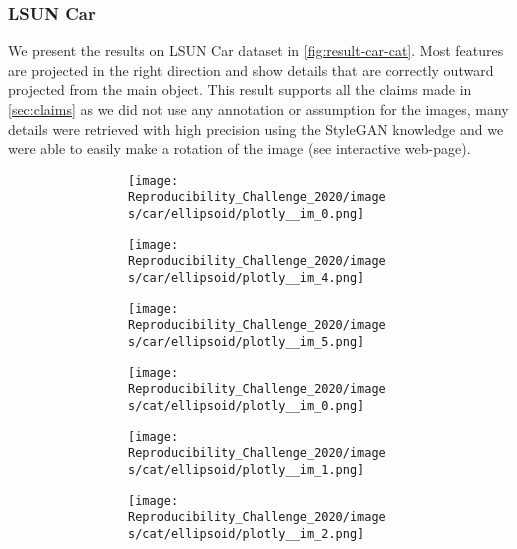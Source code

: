 \subsubsection{LSUN Car}
We present the results on LSUN Car dataset in \autoref{fig:result-car-cat}. Most features are projected in the right direction and show details that are correctly outward projected from the main object. This result supports all the claims made in \autoref{sec:claims} as we did not use any annotation or assumption for the images, many details were retrieved with high precision using the StyleGAN knowledge and we were able to easily make a rotation of the image (see interactive web-page).
\begin{figure}[h]
    \centering
    \begin{subfigure}{0.80\textwidth}
    \begin{subfigure}{0.16\textwidth}
        \centering
        \texttt{[image: Reproducibility\_Challenge\_2020/images/car/ellipsoid/plotly\_\_im\_0.png]}
    \end{subfigure}
    \begin{subfigure}{0.16\textwidth}
        \centering
        \texttt{[image: Reproducibility\_Challenge\_2020/images/car/ellipsoid/plotly\_\_im\_4.png]}
    \end{subfigure}
    \begin{subfigure}{0.16\textwidth}
        \centering
        \texttt{[image: Reproducibility\_Challenge\_2020/images/car/ellipsoid/plotly\_\_im\_5.png]}
    \end{subfigure}
    \begin{subfigure}{0.16\textwidth}
        \centering
        \texttt{[image: Reproducibility\_Challenge\_2020/images/cat/ellipsoid/plotly\_\_im\_0.png]}
    \end{subfigure}
    \begin{subfigure}{0.16\textwidth}
        \centering
        \texttt{[image: Reproducibility\_Challenge\_2020/images/cat/ellipsoid/plotly\_\_im\_1.png]}
    \end{subfigure}
    \begin{subfigure}{0.16\textwidth}
        \centering
        \texttt{[image: Reproducibility\_Challenge\_2020/images/cat/ellipsoid/plotly\_\_im\_2.png]}
    \end{subfigure}
    

\end{subfigure}
\end{figure}
